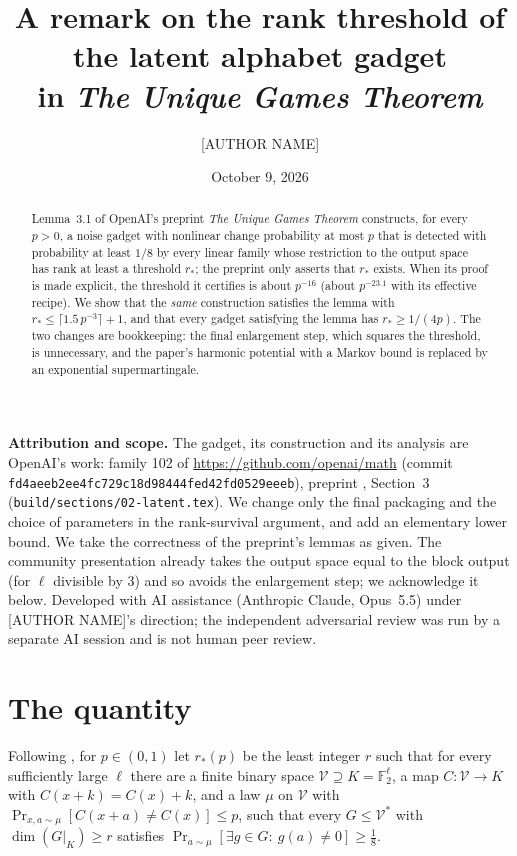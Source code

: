 \documentclass[11pt]{amsart}
\title[The rank threshold of the latent alphabet gadget]{A remark on the rank threshold of the latent alphabet gadget\\ in \emph{The Unique Games Theorem}}
\author{[AUTHOR NAME]}
\date{October 9, 2026}
\theoremstyle{remark}
\newcommand{\F}{\mathbb F}
\newcommand{\cV}{\mathcal V}
\begin{document}
\begin{abstract}
Lemma~3.1 of OpenAI's preprint \emph{The Unique Games Theorem} constructs, for every $p>0$, a
noise gadget with nonlinear change probability at most $p$ that is detected with probability at
least $1/8$ by every linear family whose restriction to the output space has rank at least a
threshold $r_*$; the preprint only asserts that $r_*$ exists. When its proof is made explicit, the
threshold it certifies is about $p^{-16}$ (about $p^{-23.1}$ with its effective recipe). We show
that the \emph{same} construction satisfies the lemma with $r_*\le\lceil1.5\,p^{-3}\rceil+1$, and
that every gadget satisfying the lemma has $r_*\ge1/(4p)$. The two changes are bookkeeping: the
final enlargement step, which squares the threshold, is unnecessary, and the paper's harmonic
potential with a Markov bound is replaced by an exponential supermartingale.
\end{abstract}
\maketitle

\noindent\textbf{Attribution and scope.} The gadget, its construction and its analysis are OpenAI's
work: family 102 of \url{https://github.com/openai/math} (commit
\nolinkurl{fd4aeeb2ee4fc729c18d98444fed42fd0529eeeb}), preprint \cite{oai}, Section~3
(\texttt{build/sections/02-latent.tex}). We change only the final packaging and the choice of
parameters in the rank-survival argument, and add an elementary lower bound. We take the
correctness of the preprint's lemmas as given. The community presentation \cite{lgb} already takes
the output space equal to the block output (for $\ell$ divisible by $3$) and so avoids the
enlargement step; we acknowledge it below. Developed with AI assistance (Anthropic Claude,
Opus~5.5) under [AUTHOR NAME]'s direction; the independent adversarial review was run by a separate
AI session and is not human peer review.

\section{The quantity}
Following \cite[Lemma 3.1]{oai}, for $p\in(0,1)$ let $r_*(p)$ be the least integer $r$ such that for
every sufficiently large $\ell$ there are a finite binary space $\cV\supseteq K=\F_2^\ell$, a map
$C:\cV\to K$ with $C(x+k)=C(x)+k$, and a law $\mu$ on $\cV$ with
$\Pr_{x,a\sim\mu}[C(x+a)\ne C(x)]\le p$, such that every $G\le\cV^*$ with $\dim(G|_K)\ge r$
satisfies $\Pr_{a\sim\mu}[\exists g\in G:\ g(a)\ne0]\ge\frac18$.
\end{document}
